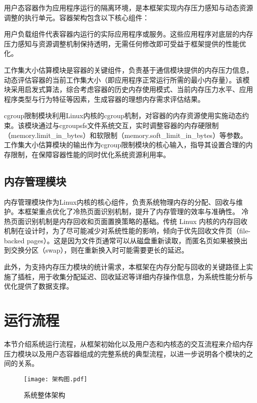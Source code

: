 用户态容器作为应用程序运行的隔离环境，是本框架实现内存压力感知与动态资源调整的执行单元。容器架构包含以下核心组件：

用户负载组件代表容器内运行的实际应用程序或服务。这些应用程序对底层的内存压力感知与资源调整机制保持透明，无需任何修改即可受益于框架提供的性能优化。

工作集大小估算模块是容器的关键组件，负责基于通信模块提供的内存压力信息，动态评估容器的当前工作集大小（即应用程序正常运行所需的最小内存量）。该模块采用启发式算法，综合考虑容器的历史内存使用模式、当前内存压力水平、应用程序类型与行为特征等因素，生成容器的理想内存需求评估结果。

cgroup限制模块利用Linux内核的cgroup机制，对容器的内存资源使用实施动态约束。该模块通过与cgroupsfs文件系统交互，实时调整容器的内存硬限制（memory.limit_in_bytes）和软限制（memory.soft_limit_in_bytes）等参数。工作集大小估算模块的输出作为cgroup限制模块的核心输入，指导其设置合理的内存限制，在保障容器性能的同时优化系统资源利用率。

\subsection{内存管理模块}

内存管理模块作为Linux内核的核心组件，负责系统物理内存的分配、回收与维护。本框架重点优化了冷热页面识别机制，提升了内存管理的效率与准确性。
冷热页面识别机制是内存回收和页面置换策略的基础。传统 Linux 内核的内存回收机制在设计时，为了尽可能减少对系统性能的影响，倾向于优先回收文件页（file-backed pages）。这是因为文件页通常可以从磁盘重新读取，而匿名页如果被换出到交换分区（swap），则在重新换入时可能需要更长的延迟。

此外，为支持内存压力模块的统计需求，本框架在内存分配与回收的关键路径上实施了插桩，用于收集分配延迟、回收延迟等详细内存操作信息，为系统性能分析与优化提供了数据支撑。


\section{运行流程}

本节介绍系统运行流程，从框架初始化以及用户态和内核态的交互流程来介绍内存压力模块以及用户态容器组成的完整系统的典型流程，以进一步说明各个模块的之间的关系。

\begin{figure}[h]
    \centering
    \texttt{[image: 架构图.pdf]}
    \caption{系统整体架构}
    \label{fig:system_architecture}
\end{figure}

